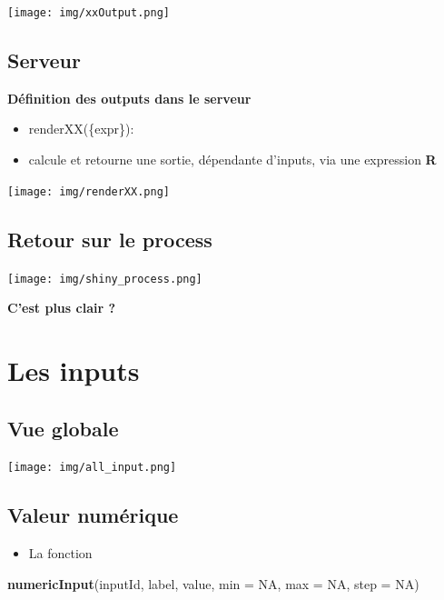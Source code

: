 \documentclass[
]{article}
\newenvironment{Shaded}{\begin{snugshade}}{\end{snugshade}}
\newcommand{\AttributeTok}[1]{\textcolor[rgb]{0.13,0.29,0.53}{#1}}
\newcommand{\ConstantTok}[1]{\textcolor[rgb]{0.56,0.35,0.01}{#1}}
\newcommand{\FunctionTok}[1]{\textcolor[rgb]{0.13,0.29,0.53}{\textbf{#1}}}
\newcommand{\NormalTok}[1]{#1}
\providecommand{\tightlist}{%
  \setlength{\itemsep}{0pt}\setlength{\parskip}{0pt}}
\begin{document}
\texttt{[image: img/xxOutput.png]}

\hypertarget{serveur}{%
\subsection{Serveur}\label{serveur}}

\textbf{Définition des outputs dans le serveur}

\begin{itemize}
\item
  renderXX(\{expr\}):
\item
  calcule et retourne une sortie, dépendante d'inputs, via une
  expression \textbf{R}
\end{itemize}

\texttt{[image: img/renderXX.png]}

\hypertarget{retour-sur-le-process}{%
\subsection{Retour sur le process}\label{retour-sur-le-process}}

\texttt{[image: img/shiny\_process.png]}

\textbf{C'est plus clair ?}

\hypertarget{les-inputs}{%
\section{Les inputs}\label{les-inputs}}

\hypertarget{vue-globale}{%
\subsection{Vue globale}\label{vue-globale}}

\texttt{[image: img/all\_input.png]}

\hypertarget{valeur-numuxe9rique}{%
\subsection{Valeur numérique}\label{valeur-numuxe9rique}}

\begin{itemize}
\tightlist
\item
  La fonction
\end{itemize}

\begin{Shaded}
\begin{Highlighting}[]
\FunctionTok{numericInput}\NormalTok{(inputId, label, value, }\AttributeTok{min =} \ConstantTok{NA}\NormalTok{, }\AttributeTok{max =} \ConstantTok{NA}\NormalTok{, }\AttributeTok{step =} \ConstantTok{NA}\NormalTok{)}
\end{Highlighting}
\end{Shaded}
\end{document}
